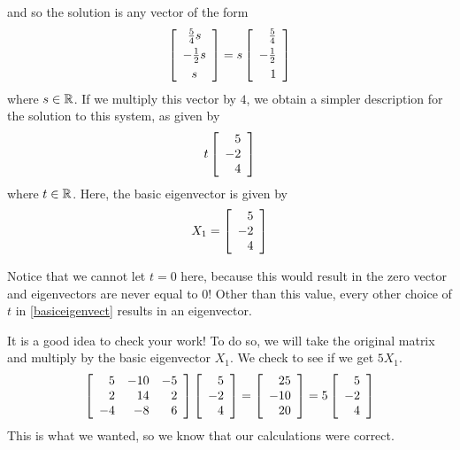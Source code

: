 \begin{solution}
and so the solution is any vector of the form
\begin{equation*}
\leftB
\begin{array}{c}
\vspace{0.05in}\frac{5}{4}s \\
-\vspace{0.05in}\frac{1}{2}s \\
s
\end{array}
\rightB =s\leftB
\begin{array}{r}
\vspace{0.05in}\frac{5}{4} \\
-\vspace{0.05in}\frac{1}{2} \\
1
\end{array}
\rightB
\end{equation*}
where $s\in \mathbb{R}$. If we multiply this vector by $4$, we obtain
a simpler description for the solution to this system, as given by
\begin{equation}
 t \left[
\begin{array}{r}
 5 \\
-2 \\
 4
\end{array}
\right]  \label{basiceigenvect}
\end{equation}
where $t\in \mathbb{R}$. Here, the basic eigenvector is given by 
\begin{equation*}
X_1 = 
\left[
\begin{array}{r}
5 \\
-2 \\
4
\end{array}
\right]
\end{equation*}

Notice that we cannot let $t=0$ here, because this would result in the zero vector and
eigenvectors are never equal to 0!
Other than this value, every other choice of $t$ in \ref{basiceigenvect} results in
an eigenvector.

It is a good idea to check your work! To do so, we will
take the original matrix and multiply by the basic eigenvector $X_1$. We check 
to see if we get $5X_1$.
\begin{equation*}
\left[
\begin{array}{rrr}
5 & -10 & -5 \\
2 & 14 & 2 \\
-4 & -8 & 6
\end{array}
\right] \left[
\begin{array}{r}
 5 \\
-2 \\
 4
\end{array}
\right] = \left[
\begin{array}{r}
 25 \\
-10 \\
 20
\end{array}
\right] =5\left[
\begin{array}{r}
 5 \\
-2 \\
 4
\end{array}
\right]
\end{equation*}
This is what we wanted, so we know that our calculations were correct.


\end{solution}
